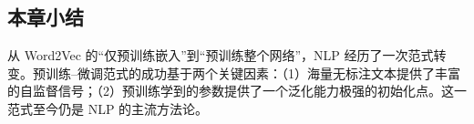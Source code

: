 \subsection{本章小结}

从 Word2Vec 的``仅预训练嵌入''到``预训练整个网络''，NLP 经历了一次范式转变。预训练--微调范式的成功基于两个关键因素：（1）海量无标注文本提供了丰富的自监督信号；（2）预训练学到的参数提供了一个泛化能力极强的初始化点。这一范式至今仍是 NLP 的主流方法论。


